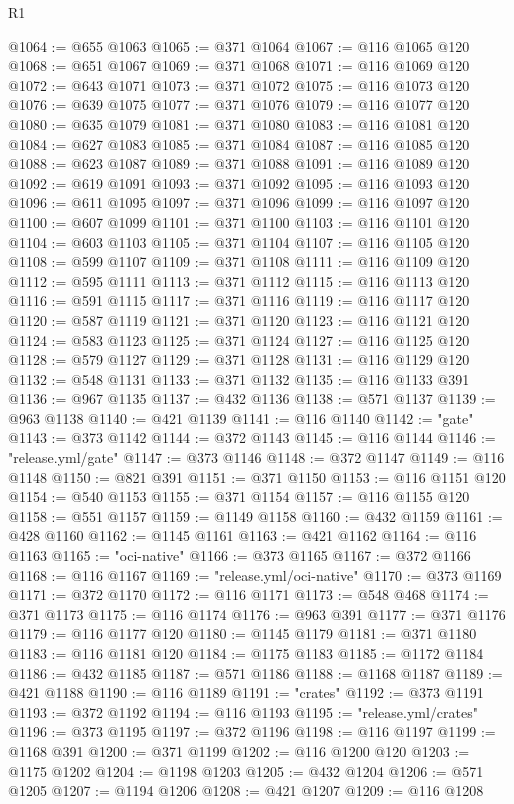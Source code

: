 \begin{lexlean}{R1}
\begin{coremodule}
@1064 := @655 @1063
@1065 := @371 @1064
@1067 := @116 @1065 @120
@1068 := @651 @1067
@1069 := @371 @1068
@1071 := @116 @1069 @120
@1072 := @643 @1071
@1073 := @371 @1072
@1075 := @116 @1073 @120
@1076 := @639 @1075
@1077 := @371 @1076
@1079 := @116 @1077 @120
@1080 := @635 @1079
@1081 := @371 @1080
@1083 := @116 @1081 @120
@1084 := @627 @1083
@1085 := @371 @1084
@1087 := @116 @1085 @120
@1088 := @623 @1087
@1089 := @371 @1088
@1091 := @116 @1089 @120
@1092 := @619 @1091
@1093 := @371 @1092
@1095 := @116 @1093 @120
@1096 := @611 @1095
@1097 := @371 @1096
@1099 := @116 @1097 @120
@1100 := @607 @1099
@1101 := @371 @1100
@1103 := @116 @1101 @120
@1104 := @603 @1103
@1105 := @371 @1104
@1107 := @116 @1105 @120
@1108 := @599 @1107
@1109 := @371 @1108
@1111 := @116 @1109 @120
@1112 := @595 @1111
@1113 := @371 @1112
@1115 := @116 @1113 @120
@1116 := @591 @1115
@1117 := @371 @1116
@1119 := @116 @1117 @120
@1120 := @587 @1119
@1121 := @371 @1120
@1123 := @116 @1121 @120
@1124 := @583 @1123
@1125 := @371 @1124
@1127 := @116 @1125 @120
@1128 := @579 @1127
@1129 := @371 @1128
@1131 := @116 @1129 @120
@1132 := @548 @1131
@1133 := @371 @1132
@1135 := @116 @1133 @391
@1136 := @967 @1135
@1137 := @432 @1136
@1138 := @571 @1137
@1139 := @963 @1138
@1140 := @421 @1139
@1141 := @116 @1140
@1142 := "gate"
@1143 := @373 @1142
@1144 := @372 @1143
@1145 := @116 @1144
@1146 := "release.yml/gate"
@1147 := @373 @1146
@1148 := @372 @1147
@1149 := @116 @1148
@1150 := @821 @391
@1151 := @371 @1150
@1153 := @116 @1151 @120
@1154 := @540 @1153
@1155 := @371 @1154
@1157 := @116 @1155 @120
@1158 := @551 @1157
@1159 := @1149 @1158
@1160 := @432 @1159
@1161 := @428 @1160
@1162 := @1145 @1161
@1163 := @421 @1162
@1164 := @116 @1163
@1165 := "oci-native"
@1166 := @373 @1165
@1167 := @372 @1166
@1168 := @116 @1167
@1169 := "release.yml/oci-native"
@1170 := @373 @1169
@1171 := @372 @1170
@1172 := @116 @1171
@1173 := @548 @468
@1174 := @371 @1173
@1175 := @116 @1174
@1176 := @963 @391
@1177 := @371 @1176
@1179 := @116 @1177 @120
@1180 := @1145 @1179
@1181 := @371 @1180
@1183 := @116 @1181 @120
@1184 := @1175 @1183
@1185 := @1172 @1184
@1186 := @432 @1185
@1187 := @571 @1186
@1188 := @1168 @1187
@1189 := @421 @1188
@1190 := @116 @1189
@1191 := "crates"
@1192 := @373 @1191
@1193 := @372 @1192
@1194 := @116 @1193
@1195 := "release.yml/crates"
@1196 := @373 @1195
@1197 := @372 @1196
@1198 := @116 @1197
@1199 := @1168 @391
@1200 := @371 @1199
@1202 := @116 @1200 @120
@1203 := @1175 @1202
@1204 := @1198 @1203
@1205 := @432 @1204
@1206 := @571 @1205
@1207 := @1194 @1206
@1208 := @421 @1207
@1209 := @116 @1208

\end{coremodule}
\end{lexlean}
